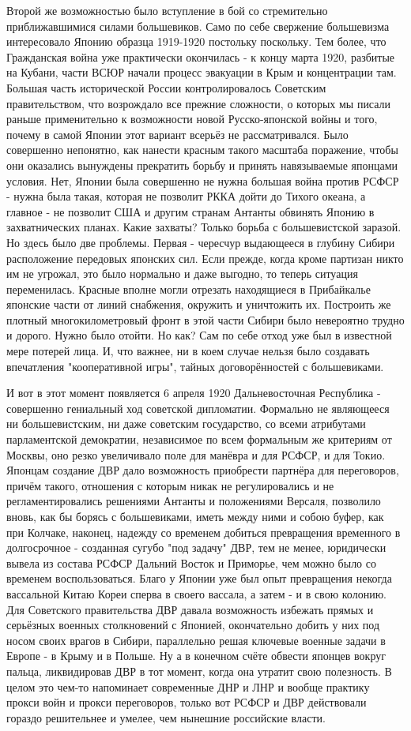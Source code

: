 Второй же возможностью было вступление в бой со стремительно приближавшимися силами большевиков. Само по себе свержение большевизма интересовало Японию образца 1919-1920 постольку поскольку. Тем более, что Гражданская война уже практически окончилась - к концу марта 1920, разбитые на Кубани, части ВСЮР начали процесс эвакуации в Крым и концентрации там. Большая часть исторической России контролировалось Советским правительством, что возрождало все прежние сложности, о которых мы писали раньше применительно к возможности новой Русско-японской войны и того, почему в самой Японии этот вариант всерьёз не рассматривался. Было совершенно непонятно, как нанести красным такого масштаба поражение, чтобы они оказались вынуждены прекратить борьбу и принять навязываемые японцами условия. Нет, Японии была совершенно не нужна большая война против РСФСР - нужна была такая, которая не позволит РККА дойти до Тихого океана, а главное - не позволит США и другим странам Антанты обвинять Японию в захватнических планах. Какие захваты? Только борьба с большевистской заразой. Но здесь было две проблемы. Первая - чересчур выдающееся в глубину Сибири расположение передовых японских сил. Если прежде, когда кроме партизан никто им не угрожал, это было нормально и даже выгодно, то теперь ситуация переменилась. Красные вполне могли отрезать находящиеся в Прибайкалье японские части от линий снабжения, окружить и уничтожить их. Построить же плотный многокилометровый фронт в этой части Сибири было невероятно трудно и дорого. Нужно было отойти. Но как? Сам по себе отход уже был в известной мере потерей лица. И, что важнее, ни в коем случае нельзя было создавать впечатления "кооперативной игры", тайных договорённостей с большевиками.

И вот в этот момент появляется 6 апреля 1920 Дальневосточная Республика - совершенно гениальный ход советской дипломатии. Формально не являющееся ни большевистским, ни даже советским государство, со всеми атрибутами парламентской демократии, независимое по всем формальным же критериям от Москвы, оно резко увеличивало поле для манёвра и для РСФСР, и для Токио. Японцам создание ДВР дало возможность приобрести партнёра для переговоров, причём такого, отношения с которым никак не регулировались и не регламентировались решениями Антанты и положениями Версаля, позволило вновь, как бы борясь с большевиками, иметь между ними и собою буфер, как при Колчаке, наконец, надежду со временем добиться превращения временного в долгосрочное - созданная сугубо "под задачу" ДВР, тем не менее, юридически вывела из состава РСФСР Дальний Восток и Приморье, чем можно было со временем воспользоваться. Благо у Японии уже был опыт превращения некогда вассальной Китаю Кореи сперва в своего вассала, а затем - и в свою колонию. Для Советского правительства ДВР давала возможность избежать прямых и серьёзных военных столкновений с Японией, окончательно добить у них под носом своих врагов в Сибири, параллельно решая ключевые военные задачи в Европе - в Крыму и в Польше. Ну а в конечном счёте обвести японцев вокруг пальца, ликвидировав ДВР в тот момент, когда она утратит свою полезность. В целом это чем-то напоминает современные ДНР и ЛНР и вообще практику прокси войн и прокси переговоров, только вот РСФСР и ДВР действовали гораздо решительнее и умелее, чем нынешние российские власти.

